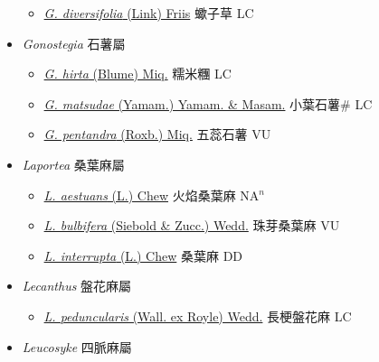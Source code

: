 \begin{itemize}
  \begin{itemize}
        \item[] \href{http://www.theplantlist.org/tpl1.1/search?q=Girardinia+diversifolia}{\textit{G. diversifolia} (Link) Friis}   蠍子草 LC
  \end{itemize}
 \item[] \textit{Gonostegia} 石薯屬
                    
  \begin{itemize}
        \item[] \href{http://www.theplantlist.org/tpl1.1/search?q=Gonostegia+hirta}{\textit{G. hirta} (Blume) Miq.}   糯米糰 LC
        \item[] \href{http://www.theplantlist.org/tpl1.1/search?q=Gonostegia+matsudae}{\textit{G. matsudae} (Yamam.) Yamam. \& Masam.}   小葉石薯\# LC
        \item[] \href{http://www.theplantlist.org/tpl1.1/search?q=Gonostegia+pentandra}{\textit{G. pentandra} (Roxb.) Miq.}   五蕊石薯 VU
  \end{itemize}
 \item[] \textit{Laportea} 桑葉麻屬
                    
  \begin{itemize}
        \item[] \href{http://www.theplantlist.org/tpl1.1/search?q=Laportea+aestuans}{\textit{L. aestuans} (L.) Chew}   火焰桑葉麻 NA$^n$
        \item[] \href{http://www.theplantlist.org/tpl1.1/search?q=Laportea+bulbifera}{\textit{L. bulbifera} (Siebold \& Zucc.) Wedd.}   珠芽桑葉麻 VU
        \item[] \href{http://www.theplantlist.org/tpl1.1/search?q=Laportea+interrupta}{\textit{L. interrupta} (L.) Chew}   桑葉麻 DD
  \end{itemize}
 \item[] \textit{Lecanthus} 盤花麻屬
                    
  \begin{itemize}
        \item[] \href{http://www.theplantlist.org/tpl1.1/search?q=Lecanthus+peduncularis}{\textit{L. peduncularis} (Wall. ex Royle) Wedd.}   長梗盤花麻 LC
  \end{itemize}
 \item[] \textit{Leucosyke} 四脈麻屬
                    

\end{itemize}

